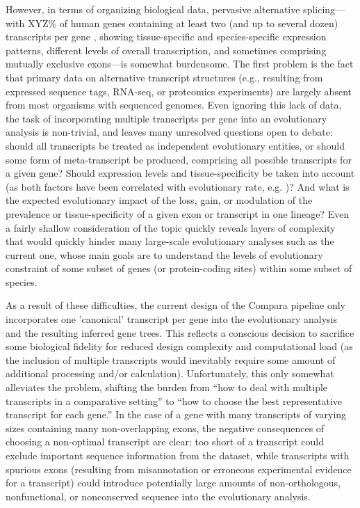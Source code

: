 However, in terms of organizing biological data, pervasive alternative
splicing---with XYZ\% of human genes containing at least two (and up
to several dozen) transcripts per gene \citep{Mironov1999}, showing
tissue-specific and species-specific expression patterns, different
levels of overall transcription, and sometimes comprising mutually
exclusive exons---is somewhat burdensome. The first problem is the
fact that primary data on alternative transcript structures (e.g.,
resulting from expressed sequence tags, RNA-seq, or proteomics
experiments) are largely absent from most organisms with sequenced
genomes. Even ignoring this lack of data, the task of incorporating
multiple transcripts per gene into an evolutionary analysis is
non-trivial, and leaves many unresolved questions open to debate:
should all transcripts be treated as independent evolutionary
entities, or should some form of meta-transcript be produced,
comprising all possible transcripts for a given gene? Should
expression levels and tissue-specificity be taken into account (as
both factors have been correlated with evolutionary rate,
e.g. \citep{Koonin2006a,Zhu2008})? And what is the expected evolutionary impact
of the loss, gain, or modulation of the prevalence or
tissue-specificity of a given exon or transcript in one lineage? Even
a fairly shallow consideration of the topic quickly reveals layers of
complexity that would quickly hinder many large-scale evolutionary
analyses such as the current one, whose main goals are to understand
the levels of evolutionary constraint of some subset of genes (or
protein-coding sites) within some subset of species.

As a result of these difficulties, the current design of the Compara
pipeline only incorporates one 'canonical' transcript per gene into
the evolutionary analysis and the resulting inferred gene trees. This
reflects a conscious decision to sacrifice some biological fidelity
for reduced design complexity and computational load (as the inclusion
of multiple transcripts would inevitably require some amount of
additional processing and/or calculation). Unfortunately, this only
somewhat alleviates the problem, shifting the burden from ``how to
deal with multiple transcripts in a comparative setting'' to ``how to
choose the best representative transcript for each gene.'' In the case
of a gene with many transcripts of varying sizes containing many
non-overlapping exons, the negative consequences of choosing a
non-optimal transcript are clear: too short of a transcript could
exclude important sequence information from the dataset, while
transcripts with spurious exons (resulting from misannotation or
erroneous experimental evidence for a transcript) could introduce
potentially large amounts of non-orthologous, nonfunctional, or
nonconserved sequence into the evolutionary analysis.

